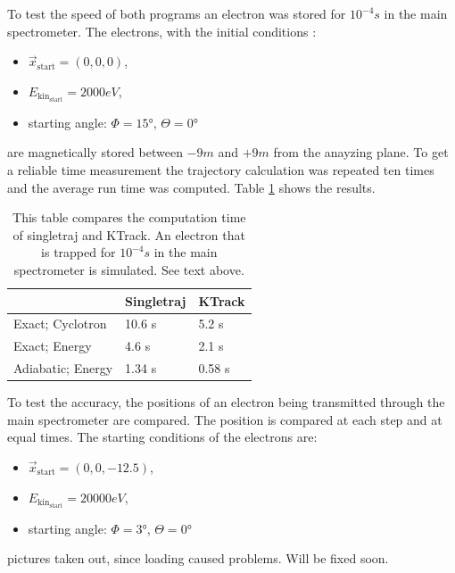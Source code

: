     To test the speed of both programs an electron was stored for $10^{-4} s$ in the main spectrometer. The electrons, with the initial conditions :
    \begin{itemize}
        \item $\vec{x}_{\mathrm{start}} = (0,0,0)$,
        \item $E_{\mathrm{kin}_{\mathrm{start}}} = 2000 eV$,
        \item starting angle: $\Phi = 15°$, $\Theta = 0°$
    \end{itemize}
     are magnetically stored between $-9m$ and $+9m$ from the anayzing plane. To get a reliable time measurement the trajectory calculation was repeated ten times and the average run time was computed. Table \ref{speedSingleKTrack} shows the results.
	\begin{center} 
    \begin{table}[t]
        \begin{tabular}{|l||l|l|}
            \hline
             & Singletraj & KTrack \\
            \hline
            \hline
            Exact; Cyclotron & 10.6 s & 5.2 s \\
            \hline
            Exact; Energy & 4.6 s & 2.1 s \\
            \hline
            Adiabatic; Energy & 1.34 s & 0.58 s \\
            \hline
        \end{tabular}
        \caption{This table compares the computation time of singletraj and KTrack. An electron that is trapped for $10^{-4} s$ in the main spectrometer is simulated. See text above.}
        \label{speedSingleKTrack}
    \end{table}
	\end{center}

    
    To test the accuracy, the positions of an electron being transmitted through the main spectrometer are compared. The position is compared at each step and at equal times. The starting conditions of the electrons are:
    \begin{itemize}
        \item $\vec{x}_{\mathrm{start}} = (0,0,-12.5)$,
        \item $E_{\mathrm{kin}_{\mathrm{start}}} = 20000 eV$,
        \item starting angle: $\Phi = 3°$, $\Theta = 0°$ 
    \end{itemize} 

    pictures taken out, since loading caused problems. Will be fixed soon.

